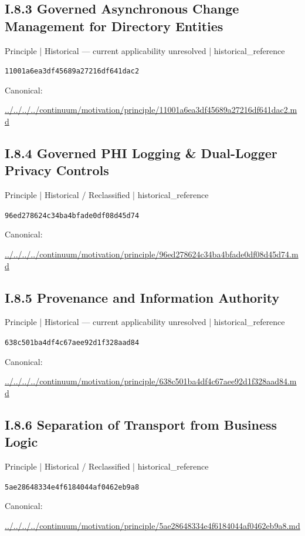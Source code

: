 \documentclass[10pt,a4paper]{article}
\begin{document}
\subsection*{I.8.3 Governed Asynchronous Change Management for Directory Entities}
\label{element-11001a6ea3df45689a27216df641dac2}
{\small Principle | Historical — current applicability unresolved | historical\_reference}\par
\texttt{11001a6ea3df45689a27216df641dac2}\par
Canonical: \par
{\footnotesize\url{../../../../continuum/motivation/principle/11001a6ea3df45689a27216df641dac2.md}}\par
\subsection*{I.8.4 Governed PHI Logging \& Dual-Logger Privacy Controls}
\label{element-96ed278624c34ba4bfade0df08d45d74}
{\small Principle | Historical / Reclassified | historical\_reference}\par
\texttt{96ed278624c34ba4bfade0df08d45d74}\par
Canonical: \par
{\footnotesize\url{../../../../continuum/motivation/principle/96ed278624c34ba4bfade0df08d45d74.md}}\par
\subsection*{I.8.5 Provenance and Information Authority}
\label{element-638c501ba4df4c67aee92d1f328aad84}
{\small Principle | Historical — current applicability unresolved | historical\_reference}\par
\texttt{638c501ba4df4c67aee92d1f328aad84}\par
Canonical: \par
{\footnotesize\url{../../../../continuum/motivation/principle/638c501ba4df4c67aee92d1f328aad84.md}}\par
\subsection*{I.8.6 Separation of Transport from Business Logic}
\label{element-5ae28648334e4f6184044af0462eb9a8}
{\small Principle | Historical / Reclassified | historical\_reference}\par
\texttt{5ae28648334e4f6184044af0462eb9a8}\par
Canonical: \par
{\footnotesize\url{../../../../continuum/motivation/principle/5ae28648334e4f6184044af0462eb9a8.md}}\par
\end{document}
